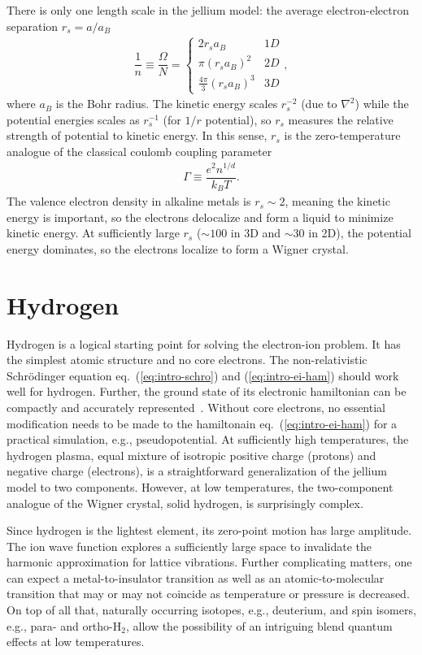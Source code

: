 There is only one length scale in the jellium model: the average electron-electron separation $r_s=a/a_B$
\begin{align}
\dfrac{1}{n} \equiv \dfrac{\Omega}{N} = \left\{\begin{array}{lr}
2 r_s a_B & 1D\\
\pi(r_sa_B)^2 & 2D\\
\frac{4\pi}{3}(r_sa_B)^3 & 3D
\end{array}\right.,
\end{align}
where $a_B$ is the Bohr radius. The kinetic energy scales $r_s^{-2}$ (due to $\nabla^2$) while the potential energies scales as $r_s^{-1}$ (for $1/r$ potential), so $r_s$ measures the relative strength of potential to kinetic energy. In this sense, $r_s$ is the zero-temperature analogue of the classical coulomb coupling parameter
\begin{align}
\Gamma \equiv \dfrac{e^2n^{1/d}}{k_BT}.
\end{align}
The valence electron density in alkaline metals is $r_s\sim2$, meaning the kinetic energy is important, so the electrons delocalize and form a liquid to minimize kinetic energy. At sufficiently large $r_s$ ($\sim 100$ in 3D and $\sim 30$ in 2D), the potential energy dominates, so the electrons localize to form a Wigner crystal.

\section{Hydrogen}
Hydrogen is a logical starting point for solving the electron-ion problem.
It has the simplest atomic structure and no core electrons.
The non-relativistic Schr\"odinger equation eq.~(\ref{eq:intro-schro}) and (\ref{eq:intro-ei-ham}) should work well for hydrogen. Further, the ground state of its electronic hamiltonian can be compactly and accurately represented~\cite{Holzmann2003}.
Without core electrons, no essential modification needs to be made to the hamiltonain eq.~(\ref{eq:intro-ei-ham}) for a practical simulation, e.g., pseudopotential.
At sufficiently high temperatures, the hydrogen plasma, equal mixture of isotropic positive charge (protons) and negative charge (electrons), is a straightforward generalization of the jellium model to two components. However, at low temperatures, the two-component analogue of the Wigner crystal, solid hydrogen, is surprisingly complex.

Since hydrogen is the lightest element, its zero-point motion has large amplitude. The ion wave function explores a sufficiently large space to invalidate the harmonic approximation for lattice vibrations.
Further complicating matters, one can expect a metal-to-insulator transition as well as an atomic-to-molecular transition that may or may not coincide as temperature or pressure is decreased.
On top of all that, naturally occurring isotopes, e.g., deuterium, and spin isomers, e.g., para- and ortho-H$_2$, allow the possibility of an intriguing blend quantum effects at low temperatures.

